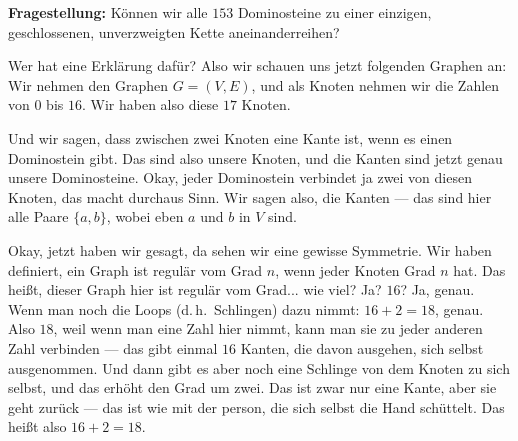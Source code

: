 \begin{math-stroke}
\textbf{Fragestellung:} Können wir alle $153$ Dominosteine zu einer einzigen, geschlossenen, unverzweigten Kette aneinanderreihen?

\begin{center}
\end{center}
\end{math-stroke}

\begin{spoken-clean}[00:20:50 - 00:23:00]
Wer hat eine Erklärung dafür? Also wir schauen uns jetzt folgenden Graphen an: Wir nehmen den Graphen $G = (V, E)$, und als Knoten nehmen wir die Zahlen von $0$ bis $16$. Wir haben also diese $17$ Knoten. 

Und wir sagen, dass zwischen zwei Knoten eine Kante ist, wenn es einen Dominostein gibt. Das sind also unsere Knoten, und die Kanten sind jetzt genau unsere Dominosteine. Okay, jeder Dominostein verbindet ja zwei von diesen Knoten, das macht durchaus Sinn. Wir sagen also, die Kanten --- das sind hier alle Paare $\{a, b\}$, wobei eben $a$ und $b$ in $V$ sind. 

Okay, jetzt haben wir gesagt, da sehen wir eine gewisse Symmetrie. Wir haben definiert, ein Graph ist regulär vom Grad $n$, wenn jeder Knoten Grad $n$ hat. Das heißt, dieser Graph hier ist regulär vom Grad... wie viel? Ja? $16$? Ja, genau. Wenn man noch die Loops (d.\,h.\ Schlingen) dazu nimmt: $16 + 2 = 18$, genau. Also $18$, weil wenn man eine Zahl hier nimmt, kann man sie zu jeder anderen Zahl verbinden --- das gibt einmal $16$ Kanten, die davon ausgehen, sich selbst ausgenommen. Und dann gibt es aber noch eine Schlinge von dem Knoten zu sich selbst, und das erhöht den Grad um zwei. Das ist zwar nur eine Kante, aber sie geht zurück --- das ist wie mit der person, die sich selbst die Hand schüttelt. Das heißt also $16 + 2 = 18$.
\end{spoken-clean}

